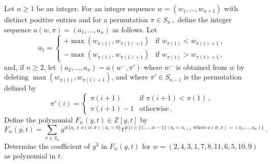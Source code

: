 Let $n\geq 1$ be an integer. For an integer sequence $w=(w_1, \dots , w_{n+1})$ with distinct positive entries and for a permutation $\pi\in S_{n}\,,$ define the integer sequence $a(w,\pi)=(a_1, \dots , a_n)$ as follows. Let 
\[ a_1= \begin{cases}    + \max( w_{\pi(1)}, w_{\pi(1) +1} ) & \text{if } w_{\pi(1)} < w_{\pi(1) +1}\,, \\   - \max( w_{\pi(1)}, w_{\pi(1) +1} ) & \text{if } w_{\pi(1)} > w_{\pi(1) +1}\,,\end{cases}\]
and, if $n\geq 2$, let $(a_2, \dots, a_n) = a(w^-, \pi')$ where $w^-$ is obtained from $w$ by deleting $\max( w_{\pi(1)}, w_{\pi(1) +1} )$, and where $\pi'\in S_{n-1}$ is the permutation defined by
\[ \pi' (i) = \begin{cases}  \pi(i+1) & \text{if } \pi(i+1)  < \pi(1) \,,\\  \pi(i+1)-1 & \text{otherwise} \,.\end{cases}\]
Define the polynomial $F_{w}(y,t)\in \mathbb{Z}[y,t]$ by
\[F_{w}(y,t) = \sum_{\pi \in S_n} y^{\#\{a_i\in a(w,\pi) \mid a_i>0 \} } t^{\#\{i\in\{1,\dots, n-1\} \mid a_i<a_{i+1} \text{ where } a(w,\pi) = (a_1,\dots , a_n) \} } \,.\]
Determine the coefficient of $y^3$ in $F_{w}(y,t)$ for $w=(2, 4, 3, 1, 7, 8, 11, 6, 5, 10, 9)$ as polynomial in $t$.

